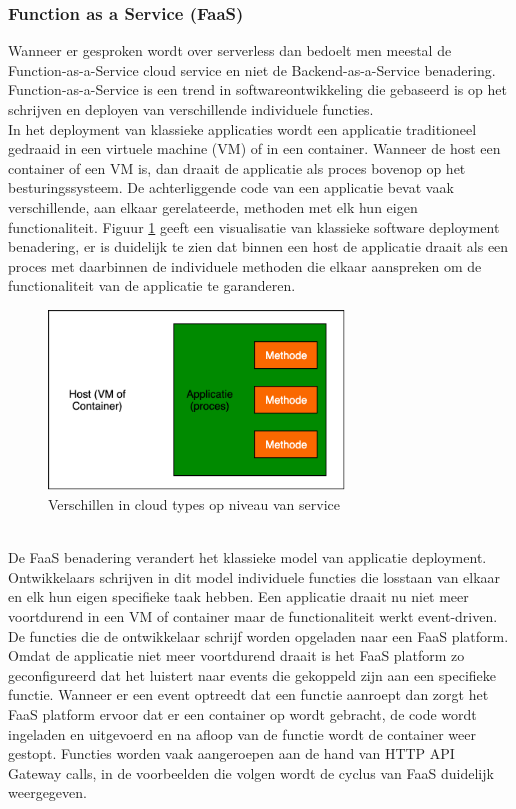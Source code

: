 \subsubsection{Function as a Service (FaaS)}
Wanneer er gesproken wordt over serverless dan bedoelt men meestal de Function-as-a-Service cloud service en niet de Backend-as-a-Service benadering.  Function-as-a-Service is een trend in softwareontwikkeling die gebaseerd is op het schrijven en deployen van verschillende individuele functies.  
\\
In het deployment van klassieke applicaties wordt een applicatie traditioneel gedraaid in een virtuele machine (VM) of in een container. Wanneer de host een container of een VM is, dan draait de applicatie als proces bovenop op het besturingssysteem. De achterliggende code van een applicatie bevat vaak verschillende, aan elkaar gerelateerde, methoden met elk hun eigen functionaliteit.  Figuur \ref{fig:traditional-software-deployment} geeft een visualisatie van klassieke software deployment benadering, er is duidelijk te zien dat binnen een host de applicatie draait als een proces met daarbinnen de individuele methoden die elkaar aanspreken om de functionaliteit van de applicatie te garanderen.
\begin{figure}
    \includegraphics[width=0.7\textwidth]{img/traditional_software_deployment.png}
    \caption{Verschillen in cloud types op niveau van service} 
    \label{fig:traditional-software-deployment}  
\end{figure}
\\
De FaaS benadering verandert het klassieke model van applicatie deployment. Ontwikkelaars schrijven in dit model individuele functies die losstaan van elkaar en elk hun eigen specifieke taak hebben. Een applicatie draait nu niet meer voortdurend in een VM of container maar de functionaliteit werkt event-driven. De functies die de ontwikkelaar schrijf worden opgeladen naar een FaaS platform. Omdat de applicatie niet meer voortdurend draait is het FaaS platform zo geconfigureerd dat het luistert naar events die gekoppeld zijn aan een specifieke functie. Wanneer er een event optreedt dat een functie aanroept dan zorgt het FaaS platform ervoor dat er een container op wordt gebracht, de code wordt ingeladen en uitgevoerd en na afloop van de functie wordt de container weer gestopt. Functies worden vaak aangeroepen aan de hand van HTTP API Gateway calls, in de voorbeelden die volgen wordt de cyclus van FaaS duidelijk weergegeven.\autocite{Roberts2017}
